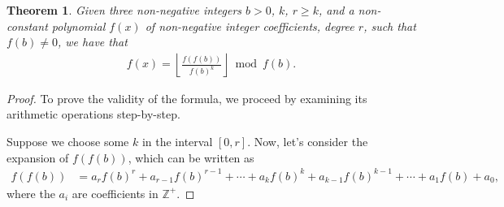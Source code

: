 \documentclass[10pt,a4paper]{article}
\theoremstyle{plain}
\newtheorem{theorem}{Theorem}[section]
\newcommand{\floor}[1]{\left\lfloor #1 \right\rfloor}
\newcommand{\Z}{\mathbb{Z}}
\begin{document}
\begin{theorem} \label{theorem:encoding}
Given three non-negative integers $b > 0$, $k$, $r \geq k$, and a non-constant polynomial $f(x)$ of non-negative integer coefficients, degree $r$, such that $f(b) \not= 0$, we have that
\begin{align*}
[x^k]f(x) = \floor{\frac{f(f(b))}{f(b)^{k}}} \bmod{f(b)} .
\end{align*}
\end{theorem}
\begin{proof}
To prove the validity of the formula, we proceed by examining its arithmetic operations step-by-step.

Suppose we choose some $k$ in the interval $[0,r]$. Now, let's consider the expansion of $f(f(b))$, which can be written as
\begin{align*}
f(f(b)) &= a_r f(b)^r + a_{r-1} f(b)^{r-1} + \cdots + a_{k} f(b)^{k} + a_{k-1} f(b)^{k-1} + \cdots + a_1 f(b) + a_0 ,
\end{align*}
where the $a_i$ are coefficients in $\Z^+$.


\end{proof}
\end{document}
